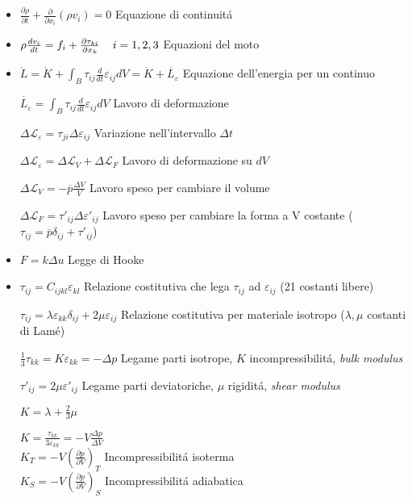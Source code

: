 \documentclass[a4paper]{article}
\begin{document}
\begin{itemize}
	\item $\frac{\partial \rho}{\partial t}+\frac{\partial}{\partial x_i}(\rho v_i)=0$ Equazione di continuit\'a
	
	\item $\rho \frac{d v_i}{dt}=f_i+\frac{\partial \tau_{ki}}{\partial x_k} \hspace{0.4cm} i=1,2,3$ Equazioni del moto
	
	\item $\dot{L}=\dot{K}+\int_{B} \tau_{ij} \frac{d}{dt}$$\varepsilon_{ij}dV=\dot{K}+\dot{L_\varepsilon}$ Equazione dell'energia per un continuo
	
	$\dot{L_\varepsilon}=\int_{B} \tau_{ij} \frac{d}{dt}$$\varepsilon_{ij}dV$ Lavoro di deformazione
	
	$\Delta \mathcal{L}_\varepsilon= \tau_{ji}\Delta \varepsilon_{ij}$ Variazione nell'intervallo $\Delta t$
	
	$\Delta \mathcal{L}_\varepsilon = \Delta \mathcal{L}_V + \Delta \mathcal{L}_F$ Lavoro di deformazione su $dV$
	
	$\Delta \mathcal{L}_V=-\overline{p} \frac{\Delta V}{V}$ Lavoro speso per cambiare il volume
	
	$\Delta \mathcal{L}_F = \tau'_{ij} \Delta \varepsilon'_{ij}$ Lavoro speso per cambiare la forma a V costante ($\tau_{ij}=\overline{p}\delta_{ij}+\tau'_{ij}$)
	
	\item $F = k \Delta u$ Legge di Hooke
	
	\item $\tau_{ij}=C_{ijkl} \varepsilon_{kl}$ Relazione costitutiva che lega $\tau_{ij}$ ad $\varepsilon_{ij}$ (21 costanti libere)
	
	$\tau_{ij}= \lambda \varepsilon_{kk} \delta_{ij}+2 \mu \varepsilon_{ij}$ Relazione costitutiva per materiale isotropo ($\lambda, \mu$ costanti di Lam\'e)
	
	$\frac{1}{3}\tau_{kk} = K \varepsilon_{kk}=-\Delta p$ Legame parti isotrope, $K$ incompressibilit\'a, \textit{bulk modulus}
	
	$\tau'_{ij}=2 \mu \varepsilon'_{ij}$ Legame parti deviatoriche, $\mu$ rigidit\'a, \textit{shear modulus}
	
	$K=\lambda + \frac{2}{3}\mu$
	
	$K=\frac{\tau_{kk}}{3\varepsilon_{kk}}=-V\frac{\Delta p}{\Delta V}$\\
	$K_T=-V(\frac{\partial p}{\partial V})_T$ Incompressibilit\'a isoterma\\
	$K_S=-V(\frac{\partial p}{\partial V})_S$ Incompressibilit\'a adiabatica
	

\end{itemize}
\end{document}
